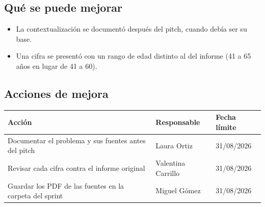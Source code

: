 \documentclass[11pt,a4paper]{article}
\begin{document}
\subsection{Qué se puede mejorar}
\begin{itemize}[leftmargin=1.5em]
  \item {La contextualización se documentó después del pitch, cuando debía ser su base.}
  \item {Una cifra se presentó con un rango de edad distinto al del informe (41 a 65 años en lugar de 41 a 60).}
\end{itemize}

\subsection{Acciones de mejora}
\begin{tabularx}{\textwidth}{X l l}
  \toprule
  \textbf{Acción} & \textbf{Responsable} & \textbf{Fecha límite} \\
  \midrule
  Documentar el problema y sus fuentes antes del pitch & Laura Ortiz & 31/08/2026 \\
  Revisar cada cifra contra el informe original & Valentina Carrillo & 31/08/2026 \\
  Guardar los PDF de las fuentes en la carpeta del sprint & Miguel Gómez & 31/08/2026 \\
  \bottomrule
\end{tabularx}
\end{document}
